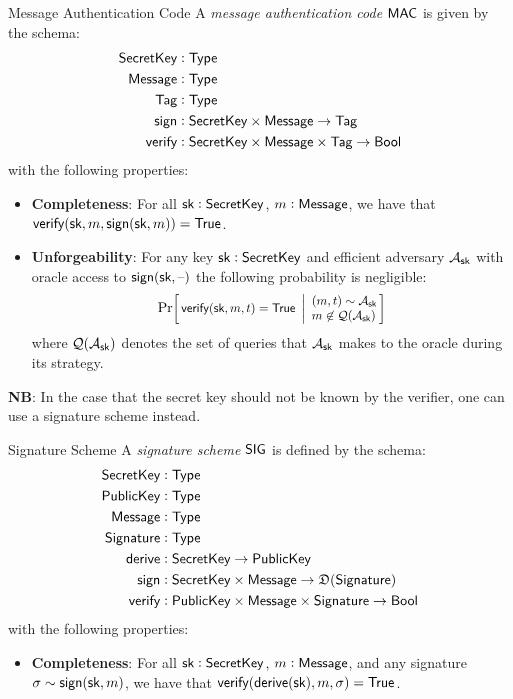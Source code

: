 \begin{definitiontoc}{Message Authentication Code}
    A \emph{message authentication code} ${\textsf{MAC}}$ is given by the schema:
    \begin{align*}
        {\textsf{SecretKey}} &: {\textsf{Type}} \\
        {\textsf{Message}}   &: {\textsf{Type}} \\
        {\textsf{Tag}}       &: {\textsf{Type}} \\
        {\textsf{sign}}      &: {\textsf{SecretKey}} \times {\textsf{Message}} \to {\textsf{Tag}} \\
        {\textsf{verify}}    &: {\textsf{SecretKey}} \times {\textsf{Message}} \times {\textsf{Tag}} \to {\textsf{Bool}}
    \end{align*}
    with the following properties:
    \begin{itemize}
        \item \textbf{Completeness}: For all ${\textsf{sk}} : {\textsf{SecretKey}}$, $m : {\textsf{Message}}$, we have that ${\textsf{verify}}({\textsf{sk}}, m, {\textsf{sign}}({\textsf{sk}}, m)) = {\textsf{True}}$.
        \item \textbf{Unforgeability}: For any key ${\textsf{sk}} : {\textsf{SecretKey}}$ and efficient adversary $\mathcal{A}_{\textsf{sk}}$ with oracle access to ${\textsf{sign}}({\textsf{sk}}, {\textrm{--}})$ the following probability is negligible:
            \[
                \Prob{
                    \verify(\sk, m, t) = \True
                }{
                    (m, t) \sim \mathcal{A}_\sk \\
                    m \not\in \mathcal{Q}(\mathcal{A}_\sk)
                }
            \]
            where $\mathcal{Q}(\mathcal{A}_{\textsf{sk}})$ denotes the set of queries that $\mathcal{A}_{\textsf{sk}}$ makes to the oracle during its strategy.
    \end{itemize}

    \textbf{NB}: In the case that the secret key should not be known by the verifier, one can use a signature scheme instead.
\end{definitiontoc}

\begin{definitiontoc}{Signature Scheme}
    A \emph{signature scheme} ${\textsf{SIG}}$ is defined by the schema:
    \begin{align*}
        {\textsf{SecretKey}}    &: {\textsf{Type}} \\
        {\textsf{PublicKey}}    &: {\textsf{Type}} \\
        {\textsf{Message}}      &: {\textsf{Type}} \\
        {\textsf{Signature}}    &: {\textsf{Type}} \\
        {\textsf{derive}}       &: {\textsf{SecretKey}} \to {\textsf{PublicKey}} \\
        {\textsf{sign}}         &: {\textsf{SecretKey}} \times {\textsf{Message}} \to \mathfrak{D}({\textsf{Signature}}) \\
        {\textsf{verify}}       &: {\textsf{PublicKey}} \times {\textsf{Message}} \times {\textsf{Signature}} \to {\textsf{Bool}}
    \end{align*}
    with the following properties:
    \begin{itemize}
        \item \textbf{Completeness}: For all ${\textsf{sk}} : {\textsf{SecretKey}}$, $m : {\textsf{Message}}$, and any signature $\sigma \sim {\textsf{sign}}({\textsf{sk}}, m)$, we have that ${\textsf{verify}}({\textsf{derive}}({\textsf{sk}}), m, \sigma) = {\textsf{True}}$.
    \end{itemize}
\end{definitiontoc}

